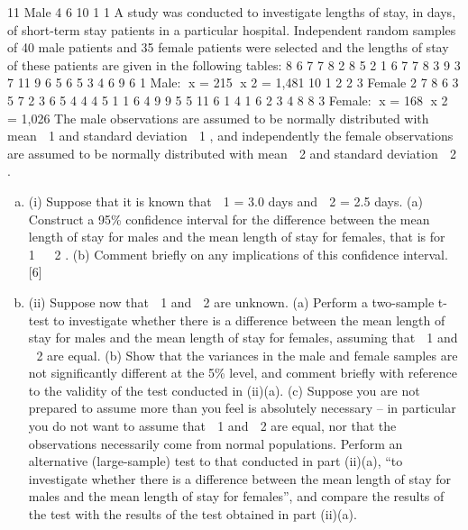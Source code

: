 \documentclass[a4paper,12pt]{article}
\begin{document}
\begin{enumerate}11
Male
4
6
10
1
1
A study was conducted to investigate lengths of stay, in days, of short-term stay
patients in a particular hospital. Independent random samples of 40 male patients and
35 female patients were selected and the lengths of stay of these patients are given in
the following tables:
8
6
7
7
8
2
8
5
2
1
6
7
7
8
3
9
3
7
11
9
6
5
6
5
3
4
6
9
6
1
Male: x = 215 x 2 = 1,481
10
1
2
2
3
Female
2
7
8
6
3
5
7
2
3
6
5
4
4
4
5
1
1
6
4
9
9
5
5
11
6
1
4
1
6
2
3
4
8
8
3
Female: x = 168 x 2 = 1,026
The male observations are assumed to be normally distributed with mean  1 and
standard deviation  1 , and independently the female observations are assumed to be
normally distributed with mean  2 and standard deviation  2 .
\begin{enumerate}[(a)]
\item (i)
Suppose that it is known that  1 = 3.0 days and  2 = 2.5 days.
(a) Construct a 95\% confidence interval for the difference between the
mean length of stay for males and the mean length of stay for females,
that is for  1   2 .
(b) Comment briefly on any implications of this confidence interval.
[6]
\item (ii)
Suppose now that  1 and  2 are unknown.
(a) Perform a two-sample t-test to investigate whether there is a difference
between the mean length of stay for males and the mean length of stay
for females, assuming that  1 and  2 are equal.
(b) Show that the variances in the male and female samples are not
significantly different at the 5\% level, and comment briefly with
reference to the validity of the test conducted in (ii)(a).
(c) Suppose you are not prepared to assume more than you feel is
absolutely necessary – in particular you do not want to assume that
 1 and  2 are equal, nor that the observations necessarily come from
normal populations.
Perform an alternative (large-sample) test to that conducted in part
(ii)(a), “to investigate whether there is a difference between the mean
length of stay for males and the mean length of stay for females”, and
compare the results of the test with the results of the test obtained in
part (ii)(a).
\end{enumerate}
\newpage


\end{enumerate}
\end{document}
